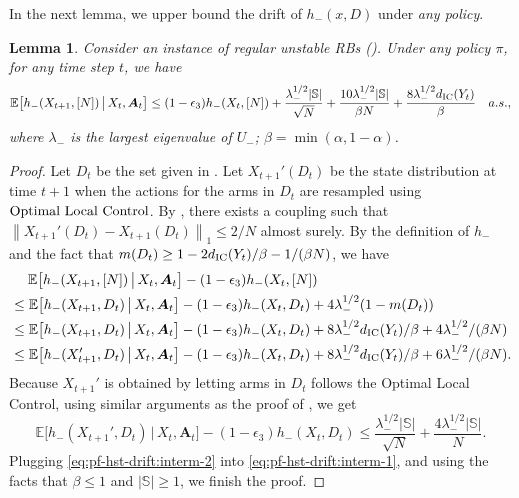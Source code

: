 \documentclass[11pt,letterpaper]{article}
\theoremstyle{plain}
\newtheorem{lemma}{Lemma}
\theoremstyle{definition}
\theoremstyle{remark}
\newcommand{\norm}[1]{\left\lVert#1\right\rVert}
\newcommand{\Ebig}[1]{\mathbb{E}\big[#1\big]}
\newcommand{\givenbig}{\,\big|\,}
\newcommand{\ve}[1]{\bm{#1}}
\newcommand{\veA}{\ve{A}}
\newcommand{\sspa}{\mathbb{S}}
\newcommand{\lppriority}{\textup{Optimal Local Control}}
\newcommand{\disy}{d_{\textup{IC}}}
\newcommand{\gapst}{\epsilon_3}
\newcommand{\subst}{-}%
\newcommand{\Ust}{U_{\subst}}
\newcommand{\hst}{h_{\subst}}
\newcommand{\lamst}{\lambda_{\subst}}
\begin{document}
In the next lemma, we upper bound the drift of $\hst(x, D)$ under \emph{any policy}. 
\begin{lemma}
    \label{lem:hst-drift}
     Consider an instance of regular unstable RBs (). Under any policy $\pi$, for any time step $t$, we have
    \begin{equation}
        \Ebig{\hst(X_{t+1}, [N]) \givenbig X_t, \veA_t} \leq (1-\gapst) \hst(X_t, [N]) + \frac{\lamst^{1/2}|\sspa|}{\sqrt{N}} + \frac{10\lamst^{1/2}|\sspa|}{\beta N} +  \frac{8\lamst^{1/2} \disy(Y_t)}{\beta} \quad a.s.,
    \end{equation}
    where $\lamst$ is the largest eigenvalue of $\Ust$; $\beta = \min(\alpha, 1-\alpha)$.  
\end{lemma}

\begin{proof}%
    Let $D_t$ be the set given in . 
    Let $X_{t+1}'(D_t)$ be the state distribution at time $t+1$ when the actions for the arms in $D_t$ are resampled using $\lppriority$.
    By , there exists a coupling such that $\norm{X_{t+1}'(D_t) - X_{t+1}(D_t)}_1 \leq 2/N$ almost surely. 
    By the definition of $\hst$ and the fact that $m(D_t) \geq 1-2\disy(Y_t) / \beta - 1/(\beta N)$, we have
    \begin{align}
        \nonumber
        &\mspace{23mu} \Ebig{\hst(X_{t+1}, [N]) \givenbig X_t, \veA_t} - (1-\gapst) \hst(X_t, [N])  \\
        \nonumber
        &\leq  \Ebig{\hst(X_{t+1}, D_t) \givenbig X_t, \veA_t} - (1-\gapst) \hst(X_t, D_t) + 4\lamst^{1/2} (1-m(D_t))  \\
        \nonumber
        &\leq  \Ebig{\hst(X_{t+1}, D_t) \givenbig X_t, \veA_t} - (1-\gapst) \hst(X_t, D_t) + 8 \lamst^{1/2} \disy(Y_t) / \beta + 4\lamst^{1/2} / (\beta N) \\
        \label{eq:pf-hst-drift:interm-1}
        &\leq \Ebig{\hst(X_{t+1}', D_t) \givenbig X_t, \veA_t} - (1-\gapst) \hst(X_t, D_t) + 8 \lamst^{1/2} \disy(Y_t) / \beta + 6 \lamst^{1/2} /(\beta N).
    \end{align}
    Because $X_{t+1}'$ is obtained by letting arms in $D_t$ follows the Optimal Local Control, 
    using similar arguments as the proof of , we get 
    \begin{equation}
        \label{eq:pf-hst-drift:interm-2}
        \Ebig{\hst(X_{t+1}', D_t) \givenbig X_t, \veA_t} - (1-\gapst) \hst(X_t, D_t)
        \leq \frac{\lamst^{1/2}|\sspa|}{\sqrt{N}} + \frac{4\lamst^{1/2}|\sspa|}{N}.
    \end{equation}
    Plugging \eqref{eq:pf-hst-drift:interm-2} into \eqref{eq:pf-hst-drift:interm-1}, and using the facts that $\beta \leq 1$ and $|\sspa| \geq 1$, we finish the proof. 
\end{proof}
\end{document}
